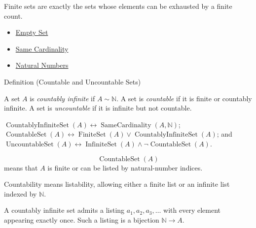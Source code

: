 \begin{remark*}[Interpretation]
Finite sets are exactly the sets whose elements can be exhausted by a finite
count.
\end{remark*}

\begin{dependencies}
\begin{itemize}
  \item \hyperref[def:empty-set]{Empty Set}
  \item \hyperref[def:same-cardinality]{Same Cardinality}
  \item \hyperref[def:natural-numbers]{Natural Numbers}
\end{itemize}
\end{dependencies}

\begin{definitionbox}{Definition (Countable and Uncountable Sets)}
\begin{definition}\label{def:countable}
A set $A$ is \emph{countably infinite} if $A\sim\mathbb{N}$. A set is
\emph{countable} if it is finite or countably infinite. A set is
\emph{uncountable} if it is infinite but not countable.
\end{definition}
\end{definitionbox}

\begin{remark*}
$\operatorname{CountablyInfiniteSet}(A)\leftrightarrow
\operatorname{SameCardinality}(A,\mathbb{N})$;
$\operatorname{CountableSet}(A)\leftrightarrow
\operatorname{FiniteSet}(A)\vee \operatorname{CountablyInfiniteSet}(A)$; and
$\operatorname{UncountableSet}(A)\leftrightarrow
\operatorname{InfiniteSet}(A)\wedge \neg\operatorname{CountableSet}(A)$.
\end{remark*}

\begin{remark*}
\[
  \operatorname{CountableSet}(A)
\] means that $A$ is finite or can be listed by
natural-number indices.
\end{remark*}

\begin{remark*}[Interpretation]
Countability means listability, allowing either a finite list or an infinite
list indexed by $\mathbb{N}$.
\end{remark*}

\begin{remark*}[Exposition]
A countably infinite set admits a listing $a_1,a_2,a_3,\dots$ with every
element appearing exactly once. Such a listing is a bijection
$\mathbb{N}\to A$.
\end{remark*}


